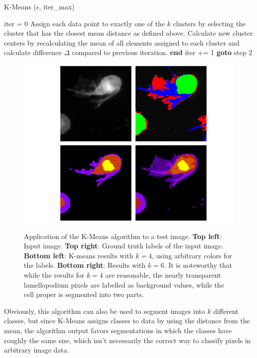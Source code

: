\begin {algorithm}
	\caption{K-Means ($\epsilon$, iter\_max)}\label{alg:kmeans_pseudo}
	\begin {algorithmic}[1]
		\State iter = 0
		\State Assign each data point to exactly one of the $k$ clusters by selecting the cluster that has the closest mean distance as defined above.
		\State Calculate new cluster centers by recalculating the mean of all elements assigned to each cluster and calculate difference $\Delta$ compared to previous iteration.
			\State \textbf{end}
		\Else
			\State iter += 1
			\State \textbf{goto} step 2
		\EndIf
	\end{algorithmic}
\end{algorithm}

\begin {figure}[!ht]
	\includegraphics{img/fig_kmeans}
	\caption{Application of the K-Means algorithm to a test image. \textbf{Top left}: Input image. \textbf{Top right}: Ground truth labels of the input image. \textbf{Bottom left}: K-means results with $k=4$,  using arbitrary colors for the labels. \textbf{Bottom right}: Results with $k=6$. It is noteworthy that while the results for $k=4$ are reasonable, the nearly transparent lamellopodium pixels are labelled as background values, while the cell proper is segmented into two parts.}
	\label{fig:kmeans}
\end {figure}

\noindent Obviously, this algorithm can also be used to segment images into $k$ different classes, but since K-Means assigns classes to data by using the distance from the mean, the algorithm output favors segmentations in which the classes have roughly the same size, which isn't necessarily the correct way to classify pixels in arbitrary image data.

